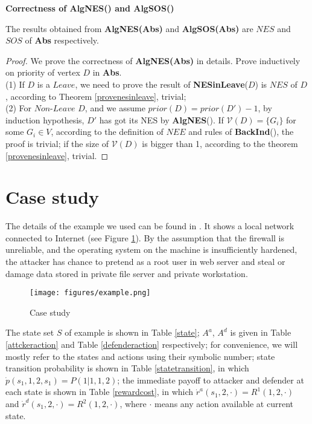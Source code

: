 \documentclass{acm_proc_article-sp}
\begin{document}
\textbf{Correctness of AlgNES() and AlgSOS()}
\begin{Theorem}
The results obtained from \textbf{AlgNES(Abs)} and \textbf{AlgSOS(Abs)} are $\textit{NES}$ and $\textit{SOS}$ of \textbf{Abs} respectively.
\end{Theorem}
\begin{proof}
We prove the correctness of \textbf{AlgNES(Abs)} in details. Prove inductively on priority of vertex $D$ in \textbf{Abs}.\\
(1) If $D$ is a $Leave$, we need to prove the result of \textbf{NESinLeave}($D$) is $\textit{NES}$ of $D$, according to Theorem \ref{provenesinleave}, trivial;\\
(2) For $\textit{Non-Leave}$ $D$, and we assume $prior(D)=prior(D')-1$, by induction hypothesis, $D'$ has got its NES by \textbf{AlgNES}(). If $\mathcal{V}(D)=\{G_{\textit{i}}\}$ for some $G_{\textit{i}}\in V$, according to the definition of $NEE$ and rules of \textbf{BackInd}(), the proof is trivial; if the size of $\mathcal{V}(D)$ is bigger than 1, according to the theorem \ref{provenesinleave}, trivial.
\end{proof}

\section{Case study}
The details of the example we used can be found in \cite{klye}. It shows a local network connected to Internet (see Figure \ref{example}). By the assumption that the firewall is unreliable, and the operating system on the machine is insufficiently hardened, the attacker has chance to pretend as a root user in web server and steal or damage data stored in private file server and private workstation.
\begin{figure}[!htpb]
\begin{center}
\texttt{[image: figures/example.png]}
\caption{Case study}
\label{example}
\end{center}
\end{figure}
The state set $S$ of example is shown in Table \ref{state}; $A^a$, $A^d$ is given in Table \ref{attckeraction} and Table \ref{defenderaction} respectively; for convenience, we will mostly refer to the states and actions using their symbolic number; state transition probability is shown in Table \ref{statetransition}, in which $\dot{p}(s_1,1,2,s_1)=P(1|1,1,2)$; the immediate payoff to attacker and defender at each state is shown in Table \ref{rewardcost}, in which $\dot{r}^a(s_{1},2,\cdot)=R^1(1,2,\cdot)$ and $\dot{r}^d(s_{1},2,\cdot)=R^2(1,2,\cdot)$, where $\cdot$ means any action available at current state.
\end{document}
